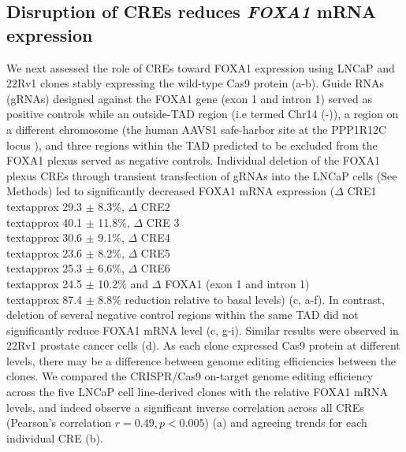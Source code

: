 
\subsection{Disruption of CREs reduces \emph{FOXA1} mRNA expression}

We next assessed the role of CREs toward FOXA1 expression using LNCaP and 22Rv1 clones stably expressing the wild-type Cas9 protein (a-b).
Guide RNAs (gRNAs) designed against the FOXA1 gene (exon 1 and intron 1) served as positive controls while an outside-TAD region (i.e termed Chr14 (-)), a region on a different chromosome (the human AAVS1 safe-harbor site at the PPP1R12C locus \cite{kronTMPRSS2ERGFusion2017,dekelverFunctionalGenomicsProteomics2010}), and three regions within the TAD predicted to be excluded from the FOXA1 plexus served as negative controls.
Individual deletion of the FOXA1 plexus CREs through transient transfection of gRNAs into the LNCaP cells (See Methods) led to significantly decreased FOXA1 mRNA expression ($\Delta$ CRE1 \\textapprox 29.3 $\pm$ 8.3\%, $\Delta$ CRE2 \\textapprox 40.1 $\pm$ 11.8\%, $\Delta$ CRE 3 \\textapprox 30.6 $\pm$ 9.1\%, $\Delta$ CRE4 \\textapprox 23.6 $\pm$ 8.2\%, $\Delta$ CRE5 \\textapprox 25.3 $\pm$ 6.6\%, $\Delta$ CRE6 \\textapprox 24.5 $\pm$ 10.2\% and $\Delta$ FOXA1 (exon 1 and intron 1) \\textapprox 87.4 $\pm$ 8.8\% reduction relative to basal levels) (c, a-f).
In contrast, deletion of several negative control regions within the same TAD did not significantly reduce FOXA1 mRNA level (c, g-i).
Similar results were observed in 22Rv1 prostate cancer cells (d).
As each clone expressed Cas9 protein at different levels, there may be a difference between genome editing efficiencies between the clones.
We compared the CRISPR/Cas9 on-target genome editing efficiency across the five LNCaP cell line-derived clones with the relative FOXA1 mRNA levels, and indeed observe a significant inverse correlation across all CREs (Pearson's correlation $r = 0.49, p < 0.005$) (a) and agreeing trends for each individual CRE (b).

